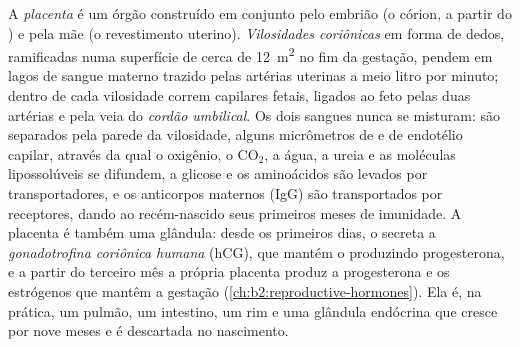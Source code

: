 \begin{definition}[A placenta]\label{def:b2:mammal-reproduction:placenta}
A \emph{placenta} é um órgão construído em conjunto pelo embrião (o
córion, a partir do ) e pela mãe (o revestimento uterino).
\emph{Vilosidades coriônicas} em forma de dedos, ramificadas numa
superfície de cerca de \qty{12}{m^2} no fim da gestação, pendem em
lagos de sangue materno trazido pelas artérias uterinas a meio litro
por minuto; dentro de cada vilosidade correm capilares fetais, ligados
ao feto pelas duas artérias e pela veia do \emph{cordão umbilical}. Os
dois sangues nunca se misturam: são separados pela parede da
vilosidade, alguns micrômetros de  e de endotélio capilar,
através da qual o oxigênio, o $\mathrm{CO_2}$, a água, a ureia e as
moléculas lipossolúveis se difundem, a glicose e os aminoácidos são
levados por transportadores, e os anticorpos maternos (IgG) são
transportados por receptores, dando ao recém-nascido seus primeiros
meses de imunidade. A placenta é também uma glândula: desde os
primeiros dias, o  secreta a \emph{gonadotrofina coriônica
humana} (hCG), que mantém o  produzindo progesterona, e a
partir do terceiro mês a própria placenta produz a progesterona e os
estrógenos que mantêm a gestação (\cref{ch:b2:reproductive-hormones}). Ela é, na prática, um
pulmão, um intestino, um rim e uma glândula endócrina que cresce por
nove meses e é descartada no nascimento.
\end{definition}

